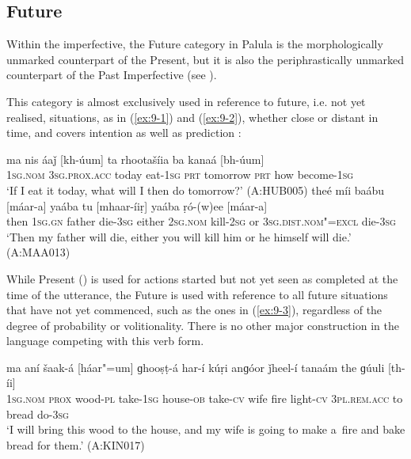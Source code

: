 \subsection{Future}
\label{subsec:9-1-2}


Within the imperfective, the Future category in Palula is the morphologically unmarked counterpart of the Present, but it is also the periphrastically unmarked counterpart of the Past Imperfective (see ). 



This category is almost exclusively used in reference to future, i.e. not yet realised, situations, as in (\ref{ex:9-1}) and (\ref{ex:9-2}), whether close or distant in time, and covers intention as well as prediction \citep[105--108]{dahl1985}:

\begin{exe}
\ex
\label{ex:9-1}
\gll ma nis áaǰ [kh-úum] ta rhootašíia ba kanaá [bh-úum]  \\
\textsc{1sg.nom} \textsc{3}\textsc{sg.prox.acc} today eat-\textsc{1sg} \textsc{prt} tomorrow  \textsc{prt} how become-\textsc{1sg} \\
\glt `If I eat it today, what will I then do tomorrow?' (A:HUB005)
\ex
\label{ex:9-2}
\gll theé míi baábu [máar-a] yaába tu [mhaar-íiṛ] yaába ṛó-(w)ee [máar-a] \\
then \textsc{1sg.gn} father die-3\textsc{sg} either 2\textsc{sg.nom} kill-2\textsc{sg }  or \textsc{3}\textsc{sg.dist.nom"=excl} die-\textsc{3}\textsc{sg}  \\
\glt `Then my father will die, either you will kill him or he himself will die.' (A:MAA013)
\end{exe}

While Present () is used for actions started but not yet seen as completed at the time of the utterance, the Future is used with reference to all future situations that have not yet commenced, such as the ones in (\ref{ex:9-3}), regardless of the degree of probability or volitionality. There is no other major construction in the language competing with this verb form.

\begin{exe}
\ex
\label{ex:9-3}
\gll ma aní šaak-á [háar"=um] ɡhooṣṭ-á har-í kúṛi anɡóor ǰheel-í tanaám the ɡúuli [th-íi] \\
\textsc{1sg.nom} \textsc{prox} wood-\textsc{pl} take-\textsc{1sg} house-\textsc{ob} take-\textsc{cv}  wife fire light-\textsc{cv } \textsc{3pl.rem.acc} to bread do-\textsc{3}\textsc{sg} \\
\glt `I will bring this wood to the house, and my wife is going to make a~fire and bake bread for
them.' (A:KIN017)
\end{exe}


